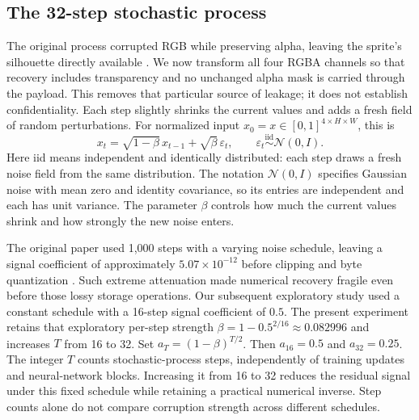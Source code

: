 \documentclass[10pt]{article}
\begin{document}
\FloatBarrier
\subsection{The 32-step stochastic process}
The original process corrupted RGB while preserving alpha, leaving the sprite's
silhouette directly available \cite{original}. We now transform all four RGBA
channels so that recovery includes transparency and no unchanged alpha mask is
carried through the payload. This removes that particular source of leakage;
it does not establish confidentiality.
Each step slightly shrinks the current values and adds a fresh field of random
perturbations. For normalized input $x_0=x\in[0,1]^{4\times H\times W}$, this is
\begin{equation}
 x_t=\sqrt{1-\beta}\,x_{t-1}+\sqrt\beta\,\varepsilon_t,
 \qquad \varepsilon_t\overset{\mathrm{iid}}\sim\mathcal N(0,I).
\end{equation}
Here iid means independent and identically distributed: each step draws a fresh
noise field from the same distribution. The notation $\mathcal N(0,I)$ specifies
Gaussian noise with mean zero and identity covariance, so its entries are
independent and each has unit variance. The parameter $\beta$ controls how much
the current values shrink and how strongly the new noise enters.

The original paper used 1,000 steps with a varying noise schedule, leaving a
signal coefficient of approximately $5.07\times10^{-12}$ before clipping and
byte quantization \cite{original}. Such extreme attenuation made numerical
recovery fragile even before those lossy storage operations. Our subsequent
exploratory study used a constant schedule with a 16-step signal coefficient of
$0.5$. The present experiment retains that exploratory per-step strength
$\beta=1-0.5^{2/16}\approx0.082996$ and increases $T$ from 16 to 32.
Set $a_T=(1-\beta)^{T/2}$. Then $a_{16}=0.5$ and $a_{32}=0.25$.
The integer $T$ counts stochastic-process steps, independently of training updates
and neural-network blocks. Increasing it from 16 to 32 reduces the residual
signal under this fixed schedule while retaining a practical numerical inverse.
Step counts alone do not compare corruption strength across different schedules.
\end{document}
